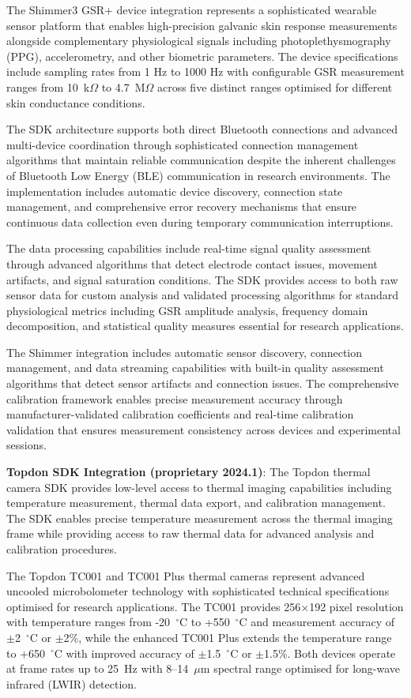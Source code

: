 \documentclass[11pt,a4paper]{report}
\begin{document}
The Shimmer3 GSR+ device integration represents a sophisticated wearable sensor platform that enables high-precision galvanic skin response measurements alongside complementary physiological signals including photoplethysmography (PPG), accelerometry, and other biometric parameters. The device specifications include sampling rates from 1 Hz to 1000 Hz with configurable GSR measurement ranges from 10~k$\Omega$ to 4.7~M$\Omega$ across five distinct ranges optimised for different skin conductance conditions.

The SDK architecture supports both direct Bluetooth connections and advanced multi-device coordination through sophisticated connection management algorithms that maintain reliable communication despite the inherent challenges of Bluetooth Low Energy (BLE) communication in research environments. The implementation includes automatic device discovery, connection state management, and comprehensive error recovery mechanisms that ensure continuous data collection even during temporary communication interruptions.

The data processing capabilities include real-time signal quality assessment through advanced algorithms that detect electrode contact issues, movement artifacts, and signal saturation conditions. The SDK provides access to both raw sensor data for custom analysis and validated processing algorithms for standard physiological metrics including GSR amplitude analysis, frequency domain decomposition, and statistical quality measures essential for research applications.

The Shimmer integration includes automatic sensor discovery, connection management, and data streaming capabilities with built-in quality assessment algorithms that detect sensor artifacts and connection issues. The comprehensive calibration framework enables precise measurement accuracy through manufacturer-validated calibration coefficients and real-time calibration validation that ensures measurement consistency across devices and experimental sessions.

\noindent \textbf{Topdon SDK Integration (proprietary 2024.1)}: The Topdon thermal camera SDK provides low-level access to thermal imaging capabilities including temperature measurement, thermal data export, and calibration management. The SDK enables precise temperature measurement across the thermal imaging frame while providing access to raw thermal data for advanced analysis and calibration procedures.

The Topdon TC001 and TC001 Plus thermal cameras represent advanced uncooled microbolometer technology with sophisticated technical specifications optimised for research applications. The TC001 provides 256$\times$192 pixel resolution with temperature ranges from -20~$^\circ$C to +550~$^\circ$C and measurement accuracy of $\pm$2~$^\circ$C or $\pm$2\%, while the enhanced TC001 Plus extends the temperature range to +650~$^\circ$C with improved accuracy of $\pm$1.5~$^\circ$C or $\pm$1.5\%. Both devices operate at frame rates up to 25~Hz with 8--14~$\mu$m spectral range optimised for long-wave infrared (LWIR) detection.
\end{document}
